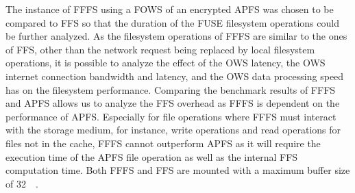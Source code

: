 The instance of \gls{FFFS} using a \gls{FOWS} of an encrypted \gls{APFS} was chosen to be compared to \gls{FFS} so that the duration of the \gls{FUSE} filesystem operations could be further analyzed. As the filesystem operations of \gls{FFFS} are similar to the ones of \gls{FFS}, other than the network request being replaced by local filesystem operations, it is possible to analyze the effect of the \gls{OWS} latency, the \gls{OWS} internet connection bandwidth and latency, and the \gls{OWS} data processing speed has on the filesystem performance. Comparing the benchmark results of \gls{FFFS} and \gls{APFS} allows us to analyze the \gls{FFS} overhead as \gls{FFFS} is dependent on the performance of \gls{APFS}. Especially for file operations where \gls{FFFS} must interact with the storage medium, for instance, write operations and read operations for files not in the cache, \gls{FFFS} cannot outperform \gls{APFS} as it will require the execution time of the \gls{APFS} file operation as well as the internal \gls{FFS} computation time. Both \gls{FFFS} and \gls{FFS} are mounted with a maximum buffer size of \SI{32}{\mega\byte}.

